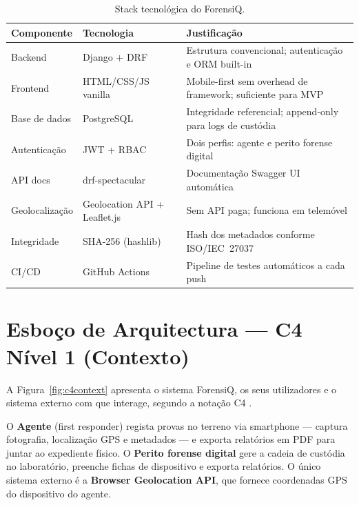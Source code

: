 \documentclass[a4paper,11pt]{article}
\begin{document}
\begin{table}[h]
\centering
\small
\begin{tabular}{@{}lll@{}}
\toprule
\textbf{Componente} & \textbf{Tecnologia} & \textbf{Justificação} \\
\midrule
Backend         & Django + DRF          & Estrutura convencional; autenticação e ORM built-in \\
Frontend        & HTML/CSS/JS vanilla   & Mobile-first sem overhead de framework; suficiente para MVP \\
Base de dados   & PostgreSQL            & Integridade referencial; append-only para logs de custódia \\
Autenticação    & JWT + RBAC            & Dois perfis: agente e perito forense digital \\
API docs        & drf-spectacular       & Documentação Swagger UI automática \\
Geolocalização  & Geolocation API + Leaflet.js & Sem API paga; funciona em telemóvel \\
Integridade     & SHA-256 (hashlib)     & Hash dos metadados conforme ISO/IEC~27037 \\
CI/CD           & GitHub Actions        & Pipeline de testes automáticos a cada push \\
\bottomrule
\end{tabular}
\caption{Stack tecnológica do ForensiQ.}
\end{table}

\section{Esboço de Arquitectura — C4 Nível 1 (Contexto)}

A Figura~\ref{fig:c4context} apresenta o sistema ForensiQ, os seus utilizadores
e o sistema externo com que interage, segundo a notação C4 \citep{brown2014}.

O \textbf{Agente} (first responder) regista provas no terreno via smartphone —
captura fotografia, localização GPS e metadados — e exporta relatórios em PDF
para juntar ao expediente físico. O \textbf{Perito forense digital} gere a
cadeia de custódia no laboratório, preenche fichas de dispositivo e exporta
relatórios. O único sistema externo é a \textbf{Browser Geolocation API}, que
fornece coordenadas GPS do dispositivo do agente.
\end{document}
